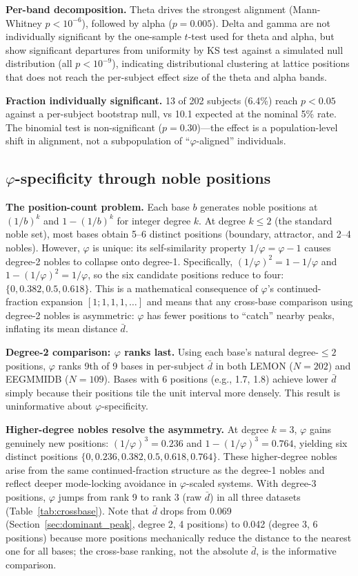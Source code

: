 \documentclass[11pt,a4paper]{article}
\newcommand{\phisym}{\varphi}
\begin{document}
\textbf{Per-band decomposition.} Theta drives the strongest alignment (Mann-Whitney $p < 10^{-6}$), followed by alpha ($p = 0.005$). Delta and gamma are not individually significant by the one-sample $t$-test used for theta and alpha, but show significant departures from uniformity by KS test against a simulated null distribution (all $p < 10^{-9}$), indicating distributional clustering at lattice positions that does not reach the per-subject effect size of the theta and alpha bands.

\textbf{Fraction individually significant.} 13 of 202 subjects (6.4\%) reach $p < 0.05$ against a per-subject bootstrap null, vs 10.1 expected at the nominal 5\% rate. The binomial test is non-significant ($p = 0.30$)---the effect is a population-level shift in alignment, not a subpopulation of ``$\phisym$-aligned'' individuals.

\subsection{$\phisym$-specificity through noble positions}
\label{sec:crossbase}

\textbf{The position-count problem.} Each base $b$ generates noble positions at $(1/b)^k$ and $1 - (1/b)^k$ for integer degree $k$. At degree $k \leq 2$ (the standard noble set), most bases obtain 5--6 distinct positions (boundary, attractor, and 2--4 nobles). However, $\phisym$ is unique: its self-similarity property $1/\phisym = \phisym - 1$ causes degree-2 nobles to collapse onto degree-1. Specifically, $(1/\phisym)^2 = 1 - 1/\phisym$ and $1 - (1/\phisym)^2 = 1/\phisym$, so the six candidate positions reduce to four: $\{0, 0.382, 0.5, 0.618\}$. This is a mathematical consequence of $\phisym$'s continued-fraction expansion $[1; 1, 1, 1, \ldots]$ and means that any cross-base comparison using degree-2 nobles is asymmetric: $\phisym$ has fewer positions to ``catch'' nearby peaks, inflating its mean distance $\bar{d}$.

\textbf{Degree-2 comparison: $\phisym$ ranks last.} Using each base's natural degree-$\leq 2$ positions, $\phisym$ ranks 9th of 9 bases in per-subject $\bar{d}$ in both LEMON ($N = 202$) and EEGMMIDB ($N = 109$). Bases with 6 positions (e.g., 1.7, 1.8) achieve lower $\bar{d}$ simply because their positions tile the unit interval more densely. This result is uninformative about $\phisym$-specificity.

\textbf{Higher-degree nobles resolve the asymmetry.} At degree $k = 3$, $\phisym$ gains genuinely new positions: $(1/\phisym)^3 = 0.236$ and $1 - (1/\phisym)^3 = 0.764$, yielding six distinct positions $\{0, 0.236, 0.382, 0.5, 0.618, 0.764\}$. These higher-degree nobles arise from the same continued-fraction structure as the degree-1 nobles and reflect deeper mode-locking avoidance in $\phisym$-scaled systems. With degree-3 positions, $\phisym$ jumps from rank 9 to rank 3 (raw $\bar{d}$) in all three datasets (Table~\ref{tab:crossbase}). Note that $\bar{d}$ drops from 0.069 (Section~\ref{sec:dominant_peak}, degree 2, 4 positions) to 0.042 (degree 3, 6 positions) because more positions mechanically reduce the distance to the nearest one for all bases; the cross-base ranking, not the absolute $\bar{d}$, is the informative comparison.
\end{document}
